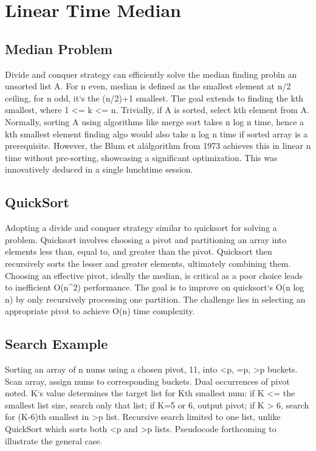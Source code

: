 \section*{Linear Time Median}

\subsection*{Median Problem}
Divide and conquer strategy can efficiently solve the median finding prob\. in an unsorted list A\@.
For n even, median is defined as the smallest element at n/2 ceiling, for n odd, it`s the (n/2)+1 smallest.
The goal extends to finding the kth smallest, where 1 \textless{}= k \textless{}= n.
Trivially, if A is sorted, select kth element from A\@.
Normally, sorting A using algorithms like merge sort takes n log n time, hence a kth smallest element finding algo would also take n log n time if sorted array is a prerequisite.
However, the Blum et al\. algorithm from 1973 achieves this in linear n time without pre-sorting, showcasing a significant optimization.
This was innovatively deduced in a single lunchtime session.

\subsection*{QuickSort}
Adopting a divide and conquer strategy similar to quicksort for solving a problem.
Quicksort involves choosing a pivot and partitioning an array into elements less than, equal to, and greater than the pivot.
Quicksort then recursively sorts the lesser and greater elements, ultimately combining them.
Choosing an effective pivot, ideally the median, is critical as a poor choice leads to inefficient O(n\textasciicircum{}2) performance.
The goal is to improve on quicksort`s O(n log n) by only recursively processing one partition.
The challenge lies in selecting an appropriate pivot to achieve O(n) time complexity.

\subsection*{Search Example}
Sorting an array of n nums using a chosen pivot, 11, into \textless{}p, =p, \textgreater{}p buckets.
Scan array, assign nums to corresponding buckets.
Dual occurrences of pivot noted.
K`s value determines the target list for Kth smallest num: if K \textless{}= the smallest list size, search only that list; if K=5 or 6, output pivot; if K \textgreater{} 6, search for (K-6)th smallest in \textgreater{}p list.
Recursive search limited to one list, unlike QuickSort which sorts both \textless{}p and \textgreater{}p lists.
Pseudocode forthcoming to illustrate the general case.

